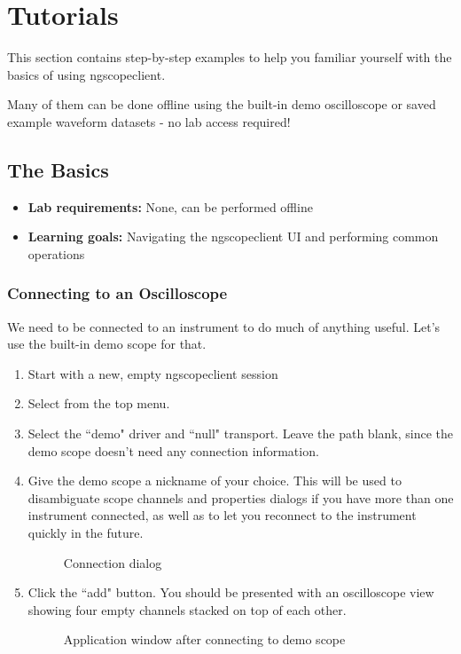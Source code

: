 \chapter{Tutorials}

This section contains step-by-step examples to help you familiar yourself with the basics of using ngscopeclient.

Many of them can be done offline using the built-in demo oscilloscope or saved example waveform datasets - no lab
access required!

\section{The Basics}

\begin{itemize}
\item \textbf{Lab requirements:} None, can be performed offline
\item \textbf{Learning goals:} Navigating the ngscopeclient UI and performing common operations
\end{itemize}

\subsection{Connecting to an Oscilloscope}

We need to be connected to an instrument to do much of anything useful. Let's use the built-in demo scope for that.

\begin{enumerate}
\item Start with a new, empty ngscopeclient session
\item Select  from the top menu.
\item Select the ``demo" driver and ``null" transport. Leave the path blank, since the demo scope doesn't need any
connection information.
\item Give the demo scope a nickname of your choice. This will be used to disambiguate scope channels and properties
dialogs if you have more than one instrument connected, as well as to let you reconnect to the instrument quickly in
the future.

\begin{figure}[h]
\centering
{}
\caption{Connection dialog}
\label{basic-connect}
\end{figure}

\item Click the ``add" button. You should be presented with an oscilloscope view showing four empty channels stacked on
top of each other.

\begin{figure}[h]
\centering
{}
\caption{Application window after connecting to demo scope}
\label{basic-connected}
\end{figure}

\end{enumerate}

